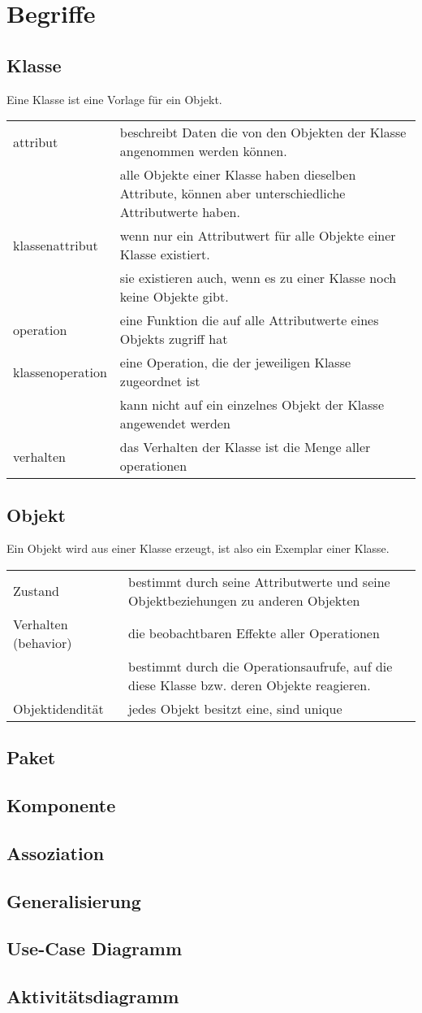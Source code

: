 \section{Begriffe}
\subsection{Klasse}
	Eine Klasse ist eine Vorlage für ein Objekt.\\
	\begin{tabular}{p{3cm}p{15cm}}
		attribut & beschreibt Daten die von den Objekten der Klasse angenommen werden
		können.\\
		& alle Objekte einer Klasse haben dieselben Attribute, können
		aber unterschiedliche Attributwerte haben.\\
		klassenattribut & wenn nur ein
		Attributwert für alle Objekte einer Klasse existiert.\\
		& sie existieren auch, wenn es zu einer Klasse noch keine Objekte gibt.\\
		operation & eine Funktion die auf alle Attributwerte eines Objekts zugriff
		hat\\
		klassenoperation & eine Operation, die der jeweiligen Klasse zugeordnet ist\\
		& kann nicht auf ein einzelnes Objekt der Klasse angewendet werden\\
		verhalten & das Verhalten der Klasse ist die Menge aller operationen\\
	\end{tabular}
\subsection{Objekt}
	Ein Objekt wird aus einer Klasse erzeugt, ist also ein Exemplar einer Klasse.\\
	\begin{tabular}{p{3cm}p{15cm}}
		Zustand & bestimmt durch seine Attributwerte und seine Objektbeziehungen zu
		anderen Objekten\\
		Verhalten (behavior) & die beobachtbaren Effekte aller Operationen\\
		& bestimmt durch die Operationsaufrufe, auf die diese Klasse bzw. deren Objekte
		reagieren.\\
		Objektidendität & jedes Objekt besitzt eine, sind unique\\
	\end{tabular}
\subsection{Paket}
\subsection{Komponente}
\subsection{Assoziation}
\subsection{Generalisierung}
\subsection{Use-Case Diagramm}
\subsection{Aktivitätsdiagramm}
